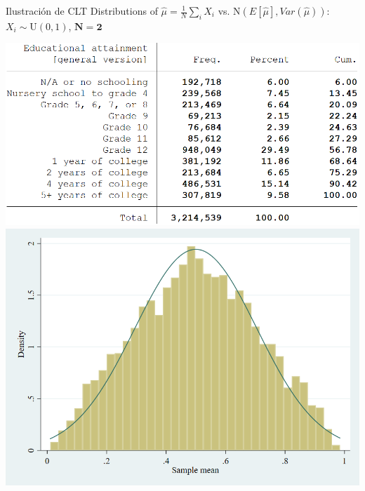 \documentclass[11pt,handout,aspectratio=169]{beamer}
\begin{document}
\begin{frame}{Ilustración de CLT}
	\vspace{0.2cm}
	Distributions of $\hat{\mu}=\frac{1}{N}\sum_i X_i$ vs. $\mathrm{N}(E[\hat\mu],Var(\hat{\mu}))$: $X_i\sim \mathrm{U}(0,1)$, $\mathbf{N=2}$
	
	\begin{center}
		\includegraphics[scale=0.4]{Stata2.png} \includegraphics[scale=0.25]{sims2.png}
	\end{center}
	
\end{frame}
\end{document}
